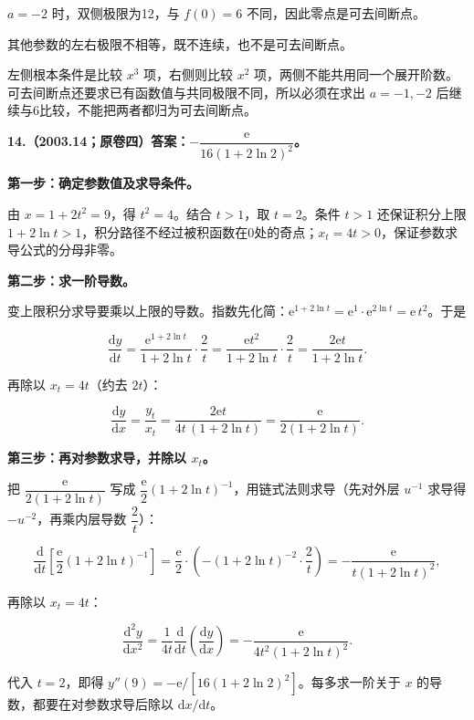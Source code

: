 \documentclass[UTF8,11pt,fontset=windows]{ctexart}
\begin{document}
$a=-2$ 时，双侧极限为12，与 $f(0)=6$ 不同，因此零点是可去间断点。

其他参数的左右极限不相等，既不连续，也不是可去间断点。

左侧根本条件是比较 $x^3$ 项，右侧则比较 $x^2$ 项，两侧不能共用同一个展开阶数。可去间断点还要求已有函数值与共同极限不同，所以必须在求出 $a=-1,-2$ 后继续与6比较，不能把两者都归为可去间断点。

\clearpage

\textbf{14.（2003.14；原卷四）答案：$-\dfrac{\mathrm e}{16(1+2\ln2)^2}$。}

\textbf{第一步：确定参数值及求导条件。}

由 $x=1+2t^2=9$，得 $t^2=4$。结合 $t>1$，取 $t=2$。条件 $t>1$ 还保证积分上限 $1+2\ln t>1$，积分路径不经过被积函数在0处的奇点；$x_t=4t>0$，保证参数求导公式的分母非零。

\textbf{第二步：求一阶导数。}

变上限积分求导要乘以上限的导数。指数先化简：$\mathrm e^{1+2\ln t}=\mathrm e^{1}\cdot\mathrm e^{2\ln t}=\mathrm e\,t^2$。于是

$$
\frac{\mathrm dy}{\mathrm dt}
=\frac{\mathrm e^{1+2\ln t}}{1+2\ln t}\cdot\frac2t
=\frac{\mathrm e t^2}{1+2\ln t}\cdot\frac2t
=\frac{2\mathrm e t}{1+2\ln t}.
$$

再除以 $x_t=4t$（约去 $2t$）：

$$
\frac{\mathrm dy}{\mathrm dx}
=\frac{y_t}{x_t}
=\frac{2\mathrm e t}{4t\,(1+2\ln t)}
=\frac{\mathrm e}{2(1+2\ln t)}.
$$

\textbf{第三步：再对参数求导，并除以 $x_t$。}

把 $\dfrac{\mathrm e}{2(1+2\ln t)}$ 写成 $\dfrac{\mathrm e}{2}(1+2\ln t)^{-1}$，用链式法则求导（先对外层 $u^{-1}$ 求导得 $-u^{-2}$，再乘内层导数 $\dfrac2t$）：

$$
\frac{\mathrm d}{\mathrm dt}\left[\frac{\mathrm e}{2}(1+2\ln t)^{-1}\right]
=\frac{\mathrm e}{2}\cdot\left(-(1+2\ln t)^{-2}\cdot\frac2t\right)
=-\frac{\mathrm e}{t(1+2\ln t)^2},
$$

再除以 $x_t=4t$：

$$
\frac{\mathrm d^2y}{\mathrm dx^2}
=\frac1{4t}\frac{\mathrm d}{\mathrm dt}\left(\frac{\mathrm dy}{\mathrm dx}\right)
=-\frac{\mathrm e}{4t^2(1+2\ln t)^2}.
$$

代入 $t=2$，即得 $\boxed{y''(9)=-\mathrm e/[16(1+2\ln2)^2]}$。每多求一阶关于 $x$ 的导数，都要在对参数求导后除以 $\mathrm dx/\mathrm dt$。
\end{document}

